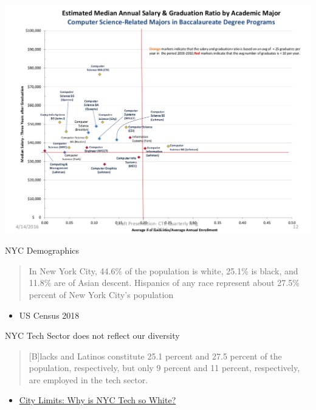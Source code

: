\documentclass[presetation]{beamer}
\begin{document}
\begin{frame}[label={sec:orga1ab4ac}]{}
\begin{center}
\includegraphics[width=.9\linewidth]{./images/salaryVgraduation.png}
\end{center}
\end{frame}

\begin{frame}[label={sec:org4ed96f1}]{NYC Demographics}
\begin{quote}
In New York City, 44.6\% of the population is white, 25.1\% is black, and
11.8\% are of Asian descent. Hispanics of any race represent about
27.5\% percent of New York City's population
\end{quote}
\begin{itemize}
\item US Census 2018
\end{itemize}
\end{frame}

\begin{frame}[label={sec:org9e6a51a}]{NYC Tech Sector does not reflect our diversity}
\begin{quote}
[B]lacks and Latinos constitute 25.1 percent and 27.5 percent of the
population, respectively, but only 9 percent and 11 percent,
respectively, are employed in the tech sector.
\end{quote}
\begin{itemize}
\item \href{https://citylimits.org/2015/09/15/why-is-new-york-citys-growing-technology-sector-so-white/}{City Limits:  Why is NYC Tech so White?}
\end{itemize}
\end{frame}
\end{document}
